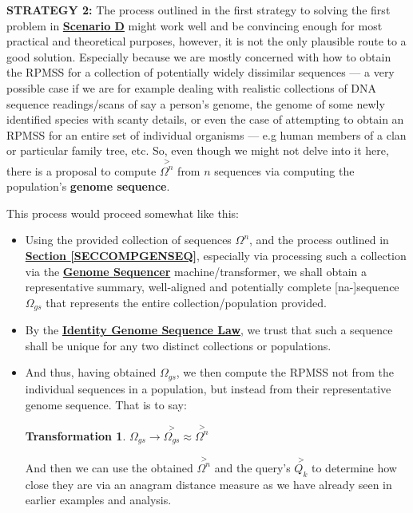 \documentclass[a4paper, 18pt]{book} %
\newtheorem{trans}{Transformation}
\begin{document}
\textbf{STRATEGY 2:} The process outlined in the first strategy to solving the first problem in \textbf{\hyperref[SECSCEND]{Scenario D}} might work well and be convincing enough for most practical and theoretical purposes, however, it is not the only plausible route to a good solution. Especially because we are mostly concerned with how to obtain the RPMSS for a collection of potentially widely dissimilar sequences --- a very possible case if we are for example dealing with realistic collections of DNA sequence readings/scans of say a person's genome, the genome of some newly identified species with scanty details, or even the case of attempting to obtain an RPMSS for an entire set of individual organisms --- e.g human members of a clan or particular family tree, etc. So, even though we might not delve into it here, there is a proposal to compute $\overset{>}{\Omega^n}$ from $n$ sequences via computing the population's \textbf{genome sequence}. 

This process would proceed somewhat like this:

\begin{itemize}
\item Using the provided collection of sequences $\Omega^n$, and the process outlined in \textbf{\hyperref[SECCOMPGENSEQ]{Section \ref{SECCOMPGENSEQ}}}, especially via processing such a collection via the \textbf{\hyperref[DEFGENOMESEQ]{Genome Sequencer}} machine/transformer, we shall obtain a representative summary, well-aligned and potentially complete [na-]sequence $\Omega_{gs}$ that represents the entire collection/population provided.
\item By the \textbf{\hyperref[LAWGDL]{Identity Genome Sequence Law}}, we trust that such a sequence shall be unique for any two distinct collections or populations.
\item {And thus, having obtained $\Omega_{gs}$, we then compute the RPMSS not from the individual sequences in a population, but instead from their representative genome sequence. That is to say:

\begin{trans}
\label{RPMSSFROMGS}
$\Omega_{gs} \rightarrow \overset{>}{\Omega_{gs}} \approx \overset{>}{\Omega^n}$
\end{trans}

And then we can use the obtained $\overset{>}{\Omega^n}$ and the query's $\overset{>}{Q_k}$ to determine how close they are via an anagram distance measure as we have already seen in earlier examples and analysis.
}
\end{itemize}
\end{document}
